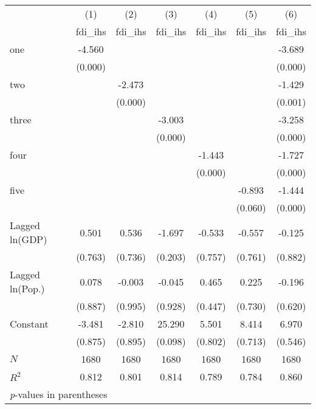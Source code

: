 \begin{tabular}{l*{6}{c}}
\hline\hline
            &\multicolumn{1}{c}{(1)}&\multicolumn{1}{c}{(2)}&\multicolumn{1}{c}{(3)}&\multicolumn{1}{c}{(4)}&\multicolumn{1}{c}{(5)}&\multicolumn{1}{c}{(6)}\\
            &\multicolumn{1}{c}{fdi\_ihs}&\multicolumn{1}{c}{fdi\_ihs}&\multicolumn{1}{c}{fdi\_ihs}&\multicolumn{1}{c}{fdi\_ihs}&\multicolumn{1}{c}{fdi\_ihs}&\multicolumn{1}{c}{fdi\_ihs}\\
\hline
one         &      -4.560&            &            &            &            &      -3.689\\
            &     (0.000)&            &            &            &            &     (0.000)\\
[1em]
two         &            &      -2.473&            &            &            &      -1.429\\
            &            &     (0.000)&            &            &            &     (0.001)\\
[1em]
three       &            &            &      -3.003&            &            &      -3.258\\
            &            &            &     (0.000)&            &            &     (0.000)\\
[1em]
four        &            &            &            &      -1.443&            &      -1.727\\
            &            &            &            &     (0.000)&            &     (0.000)\\
[1em]
five        &            &            &            &            &      -0.893&      -1.444\\
            &            &            &            &            &     (0.060)&     (0.000)\\
[1em]
Lagged ln(GDP)&       0.501&       0.536&      -1.697&      -0.533&      -0.557&      -0.125\\
            &     (0.763)&     (0.736)&     (0.203)&     (0.757)&     (0.761)&     (0.882)\\
[1em]
Lagged ln(Pop.)&       0.078&      -0.003&      -0.045&       0.465&       0.225&      -0.196\\
            &     (0.887)&     (0.995)&     (0.928)&     (0.447)&     (0.730)&     (0.620)\\
[1em]
Constant    &      -3.481&      -2.810&      25.290&       5.501&       8.414&       6.970\\
            &     (0.875)&     (0.895)&     (0.098)&     (0.802)&     (0.713)&     (0.546)\\
\hline
\(N\)       &        1680&        1680&        1680&        1680&        1680&        1680\\
\(R^{2}\)   &       0.812&       0.801&       0.814&       0.789&       0.784&       0.860\\
\hline\hline
\multicolumn{7}{l}{\footnotesize \textit{p}-values in parentheses}\\
\end{tabular}
